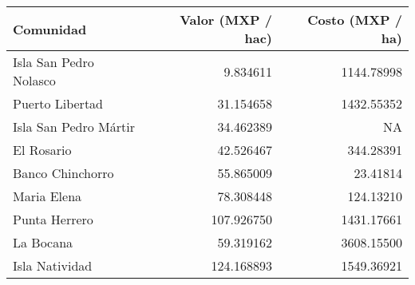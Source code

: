 
\begin{tabular}{l|r|r}
\hline
Comunidad & Valor (MXP / hac) & Costo (MXP / ha)\\
\hline
Isla San Pedro Nolasco & 9.834611 & 1144.78998\\
\hline
Puerto Libertad & 31.154658 & 1432.55352\\
\hline
Isla San Pedro Mártir & 34.462389 & NA\\
\hline
El Rosario & 42.526467 & 344.28391\\
\hline
Banco Chinchorro & 55.865009 & 23.41814\\
\hline
Maria Elena & 78.308448 & 124.13210\\
\hline
Punta Herrero & 107.926750 & 1431.17661\\
\hline
La Bocana & 59.319162 & 3608.15500\\
\hline
Isla Natividad & 124.168893 & 1549.36921\\
\hline
\end{tabular}